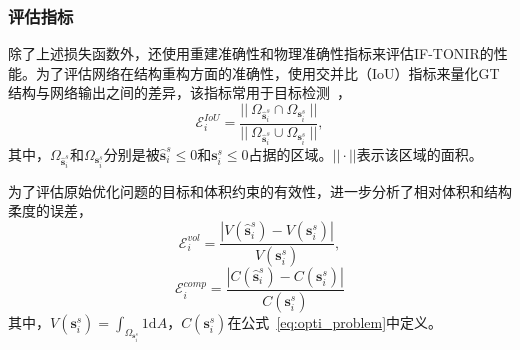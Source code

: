 \subsubsection{评估指标}
除了上述损失函数外，还使用重建准确性和物理准确性指标来评估IF-TONIR的性能。为了评估网络在结构重构方面的准确性，使用交并比（IoU）指标来量化GT结构与网络输出之间的差异，该指标常用于目标检测~\cite{IoU2019}，
\begin{equation}
    \mathcal{E}^{IoU}_i=\frac{||~\Omega_{\hat{\mathbf{s}}^s_i} \cap \Omega_{\mathbf{s}^s_i}~||}{||~\Omega_{\hat{\mathbf{s}}^s_i} \cup \Omega_{\mathbf{s}^s_i}~||},
\end{equation}
其中，$\Omega_{\hat{\mathbf{s}}^s_i}$和$\Omega_{\mathbf{s}^s_i}$分别是被$\hat{\mathbf{s}}^s_i\leq 0$和$\mathbf{s}^s_i\leq 0$占据的区域。$||\cdot||$表示该区域的面积。

为了评估原始优化问题的目标和体积约束的有效性，进一步分析了相对体积和结构柔度的误差，
\begin{equation}
    \mathcal{E}^{vol}_i=\frac{|V(\hat{\mathbf{s}}^s_i)-V(\mathbf{s}^s_i)|}{V(\mathbf{s}^s_i)},
\end{equation}
\begin{equation}
    \mathcal{E}^{comp}_i=\frac{|C(\hat{\mathbf{s}}^s_i)-C(\mathbf{s}^s_i)|}{C(\mathbf{s}^s_i)}
\end{equation}
其中，$V(\mathbf{s}^s_i)=\int_{\Omega_{\mathbf{s}^s_i}}1\mathrm{d}A$，$C(\mathbf{s}^s_i)$在公式~\eqref{eq:opti_problem}中定义。

